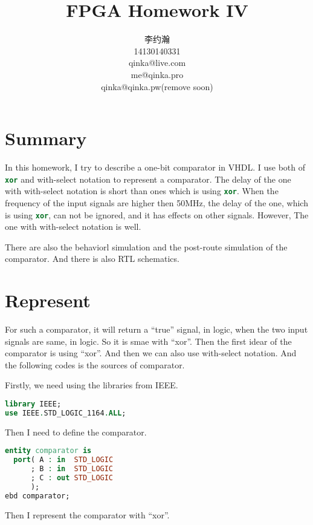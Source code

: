 \documentclass{article}
\title{FPGA Homework IV}
\author{李约瀚 \\ 14130140331 \\ qinka@live.com \\ me@qinka.pro \\ qinka@qinka.pw(remove soon)}
\begin{document}
    \maketitle
    \newpage
    \tableofcontents
    \newpage
    \section{Summary}
    \label{sec:summary}
    
    In this homework, I try to describe a one-bit comparator in VHDL.
    I use both of \lstinline[language=VHDL]|xor| and with-select notation to represent a comparator. 
    The delay of the one with with-select notation is short than ones which is using \lstinline[language=VHDL]|xor|.
    When the frequency of the input signals  are higher then 50MHz,
    the delay of the one, which is using \lstinline[language=VHDL]|xor|, can not be ignored,
    and it has effects on other signals. However, The one with with-select notation is well.

    There are also the behaviorl simulation and the post-route simulation of the comparator.
    And there is also RTL schematics.


    \section{Represent}
    \label{sec:represent}

    For such a comparator, it will return a ``true'' signal, in logic, when the two input signals are same, in logic.
    So it is smae with ``xor''. Then the first idear of the comparator is using ``xor''. And then we can also use with-select notation.
    And the following codes is the sources of comparator.

    Firstly, we need using the libraries from IEEE.

\begin{lstlisting}[language=VHDL]
library IEEE;
use IEEE.STD_LOGIC_1164.ALL;
\end{lstlisting}

    Then I need to define the comparator.

\begin{lstlisting}[language=VHDL]
entity comparator is
  port( A : in  STD_LOGIC
      ; B : in  STD_LOGIC
      ; C : out STD_LOGIC
      );
ebd comparator;
\end{lstlisting}

    Then I represent the comparator with ``xor''.
\end{document}
